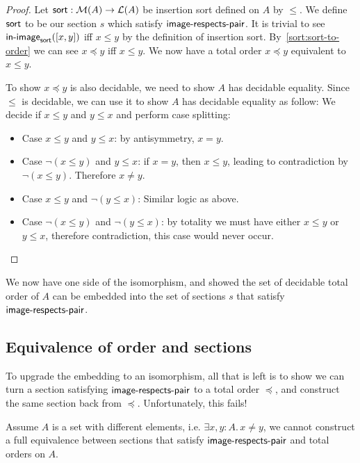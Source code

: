 \begin{proof}
    Let $\operatorname{\mathsf{sort}} : \mathcal{M}(A) \to \mathcal{L}(A)$ be insertion sort defined on $A$ by $\leq$.
    We define $\operatorname{\mathsf{sort}}$ to be our section $s$ which satisfy $\operatorname{\mathsf{image-respects-pair}}$.
    It is trivial to see $\operatorname{\mathsf{in-image}}_{\operatorname{\mathsf{sort}}}([x, y])$ iff $x \leq y$ by the definition
    of insertion sort. By~\cref{sort:sort-to-order} we can see $x \preccurlyeq y$ iff $x \leq y$.
    We now have a total order $x \preccurlyeq y$ equivalent to $x \leq y$.

    To show $x \preccurlyeq y$ is also decidable, we need to show $A$ has decidable equality.
    Since $\leq$ is decidable, we can use it to show $A$ has decidable equality as follow:
    We decide if $x \leq y$ and $y \leq x$ and perform case splitting:
    \begin{itemize}
        \item
              Case $x \leq y$ and $y \leq x$: by antisymmetry, $x = y$.
        \item
              Case $\neg(x \leq y)$ and $y \leq x$: if $x = y$, then $x \leq y$,
              leading to contradiction by $\neg(x \leq y)$. Therefore $x \neq y$.
        \item
              Case $x \leq y$ and $\neg(y \leq x)$: Similar logic as above.
        \item
              Case $\neg(x \leq y)$ and $\neg(y \leq x)$: by totality we must have either
              $x \leq y$ or $y \leq x$, therefore contradiction, this case would never occur.
    \end{itemize}
\end{proof}

We now have one side of the isomorphism, and showed the set of decidable total order of $A$
can be embedded into the set of sections $s$ that satisfy $\operatorname{\mathsf{image-respects-pair}}$.

\subsection{Equivalence of order and sections}
To upgrade the embedding to an isomorphism, all that is left
is to show we can turn a section satisfying $\operatorname{\mathsf{image-respects-pair}}$ to a total order $\preccurlyeq$, and construct the
same section back from $\preccurlyeq$. Unfortunately, this fails!

\begin{proposition}
    Assume $A$ is a set with different elements, i.e. $\exists x, y: A.\,x \neq y$,
    we cannot construct a full equivalence between sections that satisfy $\operatorname{\mathsf{image-respects-pair}}$
    and total orders on $A$.
\end{proposition}

